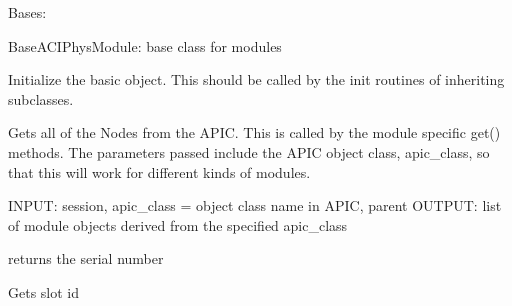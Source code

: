 \documentclass[letterpaper,10pt,english]{sphinxmanual}
\begin{document}
\begin{fulllineitems}
\label{aciphysobject:aciphysobject.BaseACIPhysModule}
Bases: {\hyperref[aciphysobject:aciphysobject.BaseACIPhysObject]{}}

BaseACIPhysModule: base class for modules

Initialize the basic object.  This should be called by the
init routines of inheriting subclasses.

\begin{fulllineitems}
\label{aciphysobject:aciphysobject.BaseACIPhysModule.get_obj}
Gets all of the Nodes from the APIC.  This is called by the
module specific get() methods.  The parameters passed include the
APIC object class, apic\_class, so that this will work for different kinds of modules.

INPUT: session, apic\_class = object class name in APIC, parent
OUTPUT: list of module objects derived from the specified apic\_class

\end{fulllineitems}


\begin{fulllineitems}
\label{aciphysobject:aciphysobject.BaseACIPhysModule.get_serial}
returns the serial number

\end{fulllineitems}


\begin{fulllineitems}
\label{aciphysobject:aciphysobject.BaseACIPhysModule.get_slot}
Gets slot id

\end{fulllineitems}


\end{fulllineitems}

\end{document}
